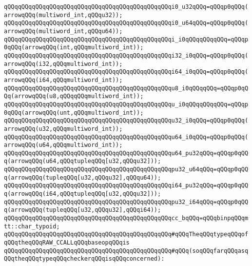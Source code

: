 \verb|qQQqqQQqqQQqqQQqqQQqqQQqqQQqqQQqqQQqqQQqqQQqqQQqi0_u32qQQq=qQQqp0qQQq(arrowqQQq(multiword_int,qQQqu32));|\newline
\verb|qQQqqQQqqQQqqQQqqQQqqQQqqQQqqQQqqQQqqQQqqQQqqQQqi0_u64qQQq=qQQqp0qQQq(arrowqQQq(multiword_int,qQQqu64));|\newline
\verb|qQQqqQQqqQQqqQQqqQQqqQQqqQQqqQQqqQQqqQQqqQQqqQQqi_i0qQQqqQQqqQQq=qQQqp0qQQq(arrowqQQq(int,qQQqmultiword_int));|\newline
\verb|qQQqqQQqqQQqqQQqqQQqqQQqqQQqqQQqqQQqqQQqqQQqqQQqi32_i0qQQq=qQQqp0qQQq(arrowqQQq(i32,qQQqmultiword_int));|\newline
\verb|qQQqqQQqqQQqqQQqqQQqqQQqqQQqqQQqqQQqqQQqqQQqqQQqi64_i0qQQq=qQQqp0qQQq(arrowqQQq(i64,qQQqmultiword_int));|\newline
\verb|qQQqqQQqqQQqqQQqqQQqqQQqqQQqqQQqqQQqqQQqqQQqqQQqu8_i0qQQqqQQq=qQQqp0qQQq(arrowqQQq(u8,qQQqqQQqmultiword_int));|\newline
\verb|qQQqqQQqqQQqqQQqqQQqqQQqqQQqqQQqqQQqqQQqqQQqqQQqu_i0qQQqqQQqqQQq=qQQqp0qQQq(arrowqQQq(unt,qQQqmultiword_int));|\newline
\verb|qQQqqQQqqQQqqQQqqQQqqQQqqQQqqQQqqQQqqQQqqQQqqQQqu32_i0qQQq=qQQqp0qQQq(arrowqQQq(u32,qQQqmultiword_int));|\newline
\verb|qQQqqQQqqQQqqQQqqQQqqQQqqQQqqQQqqQQqqQQqqQQqqQQqu64_i0qQQq=qQQqp0qQQq(arrowqQQq(u64,qQQqmultiword_int));|\newline
\newline
\verb|qQQqqQQqqQQqqQQqqQQqqQQqqQQqqQQqqQQqqQQqqQQqqQQqu64_pu32qQQq=qQQqp0qQQq(arrowqQQq(u64,qQQqtupleqQQq[u32,qQQqu32]));|\newline
\verb|qQQqqQQqqQQqqQQqqQQqqQQqqQQqqQQqqQQqqQQqqQQqqQQqpu32_u64qQQq=qQQqp0qQQq(arrowqQQq(tupleqQQq[u32,qQQqu32],qQQqu64));|\newline
\verb|qQQqqQQqqQQqqQQqqQQqqQQqqQQqqQQqqQQqqQQqqQQqqQQqi64_pu32qQQq=qQQqp0qQQq(arrowqQQq(i64,qQQqtupleqQQq[u32,qQQqu32]));|\newline
\verb|qQQqqQQqqQQqqQQqqQQqqQQqqQQqqQQqqQQqqQQqqQQqqQQqpu32_i64qQQq=qQQqp0qQQq(arrowqQQq(tupleqQQq[u32,qQQqu32],qQQqi64));|\newline
\newline
\verb|qQQqqQQqqQQqqQQqqQQqqQQqqQQqqQQqqQQqqQQqqQQqqQQqcc_bqQQq=qQQqbinpqQQqmtt::char_typoid;|\newline
\newline
\verb|qQQqqQQqqQQqqQQqqQQqqQQqqQQqqQQqqQQqqQQqqQQqqQQq#qQQqTheqQQqtypeqQQqofqQQqtheqQQqRAW_CCALLqQQqbaseopqQQqis|\newline
\verb|qQQqqQQqqQQqqQQqqQQqqQQqqQQqqQQqqQQqqQQqqQQqqQQq#qQQq(soqQQqfarqQQqasqQQqtheqQQqtypeqQQqcheckerqQQqisqQQqconcerned):|\newline
